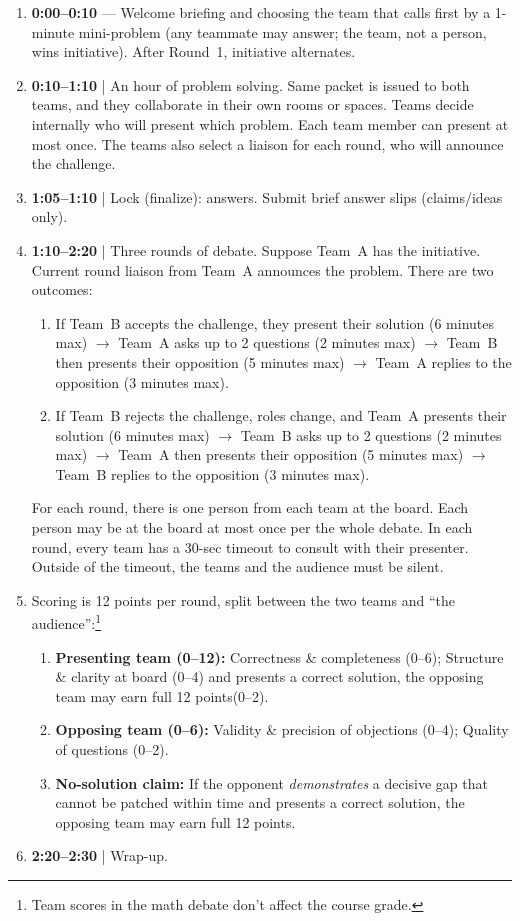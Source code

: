 \documentclass[oneside,11pt]{amsart}
\begin{document}
\begin{enumerate}[$\bullet$]
\item \textbf{0:00--0:10} --- Welcome briefing and choosing the
team that calls first by
a
1-minute mini-problem (any teammate may answer; the team, not a person, wins initiative). After Round~1, initiative alternates.

\item \textbf{0:10--1:10} | An hour of problem solving. Same packet
is issued to both teams, and they collaborate in their own rooms or spaces.
Teams decide internally who will present which problem.
Each team member can present at most once.
The teams also select a liaison for each round, who will announce the challenge.

\item \textbf{1:05--1:10} | Lock (finalize): answers. Submit brief answer slips (claims/ideas only).

\item \textbf{1:10--2:20} |
Three rounds of debate.
Suppose Team~A has the initiative.
Current round liaison from Team~A
announces the problem.
There are two outcomes:
\begin{enumerate}
\item If Team~B accepts the challenge, they present their solution
(6 minutes max) $\to$
Team~A asks up to 2 questions (2 minutes max)
$\to$
Team~B then presents their opposition (5 minutes max)
$\to$
Team~A replies to the opposition (3 minutes max).
\item If Team~B rejects the challenge, roles change, and Team~A presents their solution (6 minutes max) $\to$
Team~B asks up to 2 questions (2 minutes max)
$\to$
Team~A then presents their opposition (5 minutes max)
$\to$
Team~B replies to the opposition (3 minutes max).
\end{enumerate}
For each round, there is one person from each team at the board. Each person
may be at the board at most once per the whole debate.
In each round, every team has a 30-sec timeout to consult with their presenter. Outside of the timeout, the teams and the audience must be silent.

\item Scoring is 12 points per round,
split between the two teams and ``the audience'':\footnote{Team scores
in the math debate
don't affect the course grade.}
\begin{enumerate}
\item \textbf{Presenting team (0--12):} Correctness \& completeness (0--6);
  Structure \& clarity at board (0--4) and presents a correct solution, the opposing team may earn full 12 points(0--2).
  \item \textbf{Opposing team (0--6):} Validity \& precision of objections (0--4);
  Quality of questions (0--2).
  \item \textbf{No-solution claim:} If the opponent \emph{demonstrates} a decisive gap that cannot be patched within time and presents a correct solution, the opposing team may earn full 12 points.
\end{enumerate}

\item \textbf{2:20--2:30} | Wrap-up.
\end{enumerate}
\end{document}
